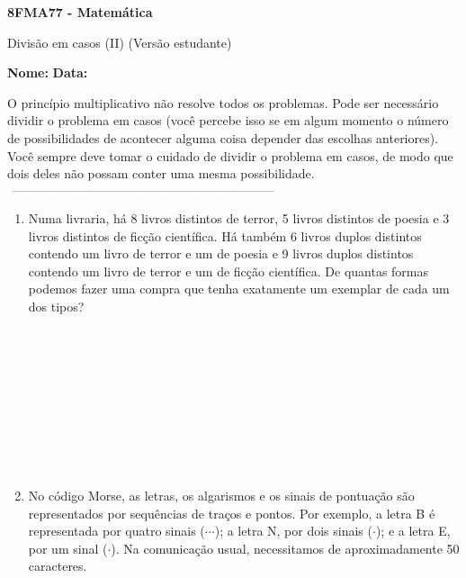\documentclass[a4paper,14pt]{article}
\begin{document}
	
	\noindent\textbf{8FMA77 - Matemática} 
	
	\begin{center}Divisão em casos (II) (Versão estudante)
	\end{center}
	
	\noindent\textbf{Nome:} \underline{\hspace{10cm}}
	\noindent\textbf{Data:} \underline{\hspace{4cm}}
	
	
	
    \begin{multicols}{2}
    	\noindent O princípio multiplicativo não resolve todos os problemas. Pode ser necessário dividir o problema em casos (você percebe isso se em algum momento o número de possibilidades de acontecer alguma coisa depender das escolhas anteriores). Você sempre deve tomar o cuidado de dividir o problema em casos, de modo que dois deles não possam conter uma mesma possibilidade.
    	\noindent\textsubscript{~---------------------------------------------------------------------------}
		\begin{enumerate}
			\item Numa livraria, há 8 livros distintos de terror, 5 livros distintos de poesia e 3 livros distintos de ficção científica. Há também 6 livros duplos distintos contendo um livro de terror e um de poesia e 9 livros duplos distintos contendo um livro de terror e um de ficção científica. De quantas formas podemos fazer uma compra que tenha exatamente um exemplar de cada um dos tipos? \\\\\\\\\\\\\\\\\\\\
			\item No código Morse, as letras, os algarismos e os sinais de pontuação são representados por sequências de traços e pontos. Por exemplo, a letra B é representada por quatro sinais (\textendash $\dotsm$); a letra N, por dois sinais  (\textendash $\cdot$); e a letra E, por um sinal ($\cdot$). Na comunicação usual, necessitamos de aproximadamente 50 caracteres.\\

\end{enumerate}
\end{multicols}
\end{document}
